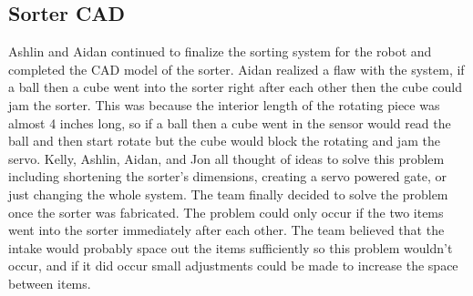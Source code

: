 \documentclass{article}
\newif\ifcontents
\begin{document}
\contentsfalse
\subsection{Sorter CAD}
Ashlin and Aidan continued to finalize the sorting system for the robot and completed the CAD model of the sorter. Aidan realized a flaw with the system, if a ball then a cube went into the sorter right after each other then the cube could jam the sorter. This was because the interior length of the rotating piece was almost 4 inches long, so if a ball then a cube went in the sensor would read the ball and then start rotate but the cube would block the rotating and jam the servo. Kelly, Ashlin, Aidan, and Jon all thought of ideas to solve this problem including shortening the sorter's dimensions, creating a servo powered gate, or just changing the whole system. The team finally decided to solve the problem once the sorter was fabricated. The problem could only occur if the two items went into the sorter immediately after each other. The team believed that the intake would probably space out the items sufficiently so this problem wouldn't occur, and if it did occur small adjustments could be made to increase the space between items.
\end{document}
